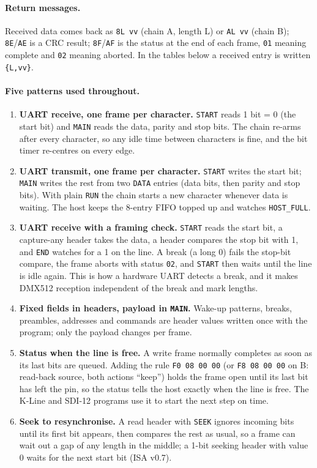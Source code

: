 \documentclass[11pt,a4paper]{article}
\newcommand{\sig}[1]{\texttt{#1}}
\begin{document}
\paragraph{Return messages.} Received data comes back as \texttt{8L vv} (chain A, length L) or \texttt{AL vv} (chain B); \texttt{8E}/\texttt{AE} is a CRC result; \texttt{8F}/\texttt{AF} is the status at the end of each frame, \texttt{01} meaning complete and \texttt{02} meaning aborted. In the tables below a received entry is written \texttt{\{L,vv\}}.

\paragraph{Five patterns used throughout.}
\begin{enumerate}
\item \textbf{UART receive, one frame per character.} \sig{START} reads 1 bit = 0 (the start bit) and \sig{MAIN} reads the data, parity and stop bits. The chain re-arms after every character, so any idle time between characters is fine, and the bit timer re-centres on every edge.
\item \textbf{UART transmit, one frame per character.} \sig{START} writes the start bit; \sig{MAIN} writes the rest from two \sig{DATA} entries (data bits, then parity and stop bits). With plain \sig{RUN} the chain starts a new character whenever data is waiting. The host keeps the 8-entry FIFO topped up and watches \sig{HOST\_FULL}.
\item \textbf{UART receive with a framing check.} \sig{START} reads the start bit, a capture-any header takes the data, a header compares the stop bit with 1, and \sig{END} watches for a 1 on the line. A break (a long 0) fails the stop-bit compare, the frame aborts with status \texttt{02}, and \sig{START} then waits until the line is idle again. This is how a hardware UART detects a break, and it makes DMX512 reception independent of the break and mark lengths.
\item \textbf{Fixed fields in headers, payload in \sig{MAIN}.} Wake-up patterns, breaks, preambles, addresses and commands are header values written once with the program; only the payload changes per frame.
\item \textbf{Status when the line is free.} A write frame normally completes as soon as its last bits are queued. Adding the rule \texttt{F0 08 00 00} (or \texttt{F8 08 00 00} on B: read-back source, both actions ``keep'') holds the frame open until its last bit has left the pin, so the status tells the host exactly when the line is free. The K-Line and SDI-12 programs use it to start the next step on time.
\item \textbf{Seek to resynchronise.} A read header with \sig{SEEK} ignores incoming bits until its first bit appears, then compares the rest as usual, so a frame can wait out a gap of any length in the middle; a 1-bit seeking header with value 0 waits for the next start bit (ISA v0.7).
\end{enumerate}
\end{document}
